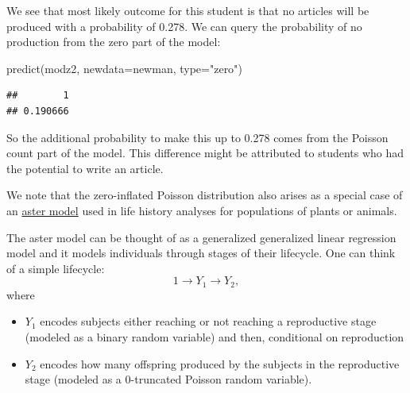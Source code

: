 \documentclass[
  ignorenonframetext,
]{beamer}
\newenvironment{Shaded}{\begin{snugshade}}{\end{snugshade}}
\newcommand{\AttributeTok}[1]{\textcolor[rgb]{0.77,0.63,0.00}{#1}}
\newcommand{\FunctionTok}[1]{\textcolor[rgb]{0.00,0.00,0.00}{#1}}
\newcommand{\NormalTok}[1]{#1}
\newcommand{\StringTok}[1]{\textcolor[rgb]{0.31,0.60,0.02}{#1}}
\providecommand{\tightlist}{%
  \setlength{\itemsep}{0pt}\setlength{\parskip}{0pt}}
\begin{document}
\begin{frame}[fragile]{}
\protect\hypertarget{section-46}{}
We see that most likely outcome for this student is that no articles
will be produced with a probability of 0.278. We can query the
probability of no production from the zero part of the model:

\vspace{12pt}
\tiny

\begin{Shaded}
\begin{Highlighting}[]
\FunctionTok{predict}\NormalTok{(modz2, }\AttributeTok{newdata=}\NormalTok{newman, }\AttributeTok{type=}\StringTok{"zero"}\NormalTok{)}
\end{Highlighting}
\end{Shaded}

\begin{verbatim}
##        1 
## 0.190666
\end{verbatim}

\vspace{12pt}
\normalsize

So the additional probability to make this up to 0.278 comes from the
Poisson count part of the model. This difference might be attributed to
students who had the potential to write an article.
\end{frame}

\begin{frame}{}
\protect\hypertarget{section-47}{}
We note that the zero-inflated Poisson distribution also arises as a
special case of an
\href{https://academic.oup.com/biomet/article-abstract/94/2/415/224189}{aster
model} used in life history analyses for populations of plants or
animals.

\vspace{12pt}

The aster model can be thought of as a generalized generalized linear
regression model and it models individuals through stages of their
lifecycle. One can think of a simple lifecycle: \[
  1 \to Y_1 \to Y_2,
\] where

\begin{itemize}
\tightlist
\item
  \(Y_1\) encodes subjects either reaching or not reaching a
  reproductive stage (modeled as a binary random variable) and then,
  conditional on reproduction
\item
  \(Y_2\) encodes how many offspring produced by the subjects in the
  reproductive stage (modeled as a 0-truncated Poisson random variable).
\end{itemize}
\end{frame}
\end{document}
